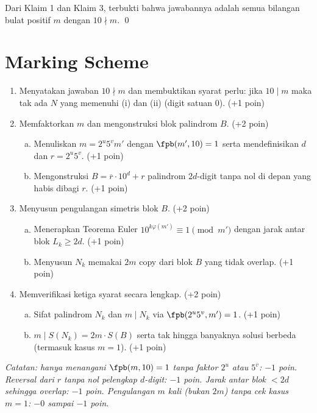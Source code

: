 Dari Klaim 1 dan Klaim 3, terbukti bahwa jawabannya adalah semua bilangan bulat positif $m$ dengan $10 \nmid m$. \qed

\newpage
\section{Marking Scheme}
\begin{enumerate}[1)]
    \item Menyatakan jawaban $10 \nmid m$ dan membuktikan syarat perlu: jika $10 \mid m$ maka tak ada $N$ yang memenuhi (i) dan (ii) (digit satuan $0$). (+1 poin)
    \item Memfaktorkan $m$ dan mengonstruksi blok palindrom $B$. (+2 poin)
    \begin{enumerate}[(a)]
        \item Menuliskan $m = 2^u 5^v m'$ dengan $\fpb(m', 10) = 1$ serta mendefinisikan $d$ dan $r = 2^u 5^v$. (+1 poin)
        \item Mengonstruksi $B = \overline{r} \cdot 10^d + r$ palindrom $2d$-digit tanpa nol di depan yang habis dibagi $r$. (+1 poin)
    \end{enumerate}
    \item Menyusun pengulangan simetris blok $B$. (+2 poin)
    \begin{enumerate}[(a)]
        \item Menerapkan Teorema Euler $10^{k\varphi(m')} \equiv 1 \pmod{m'}$ dengan jarak antar blok $L_k \ge 2d$. (+1 poin)
        \item Menyusun $N_k$ memakai $2m$ copy dari blok $B$ yang tidak overlap. (+1 poin)
    \end{enumerate}
    \item Memverifikasi ketiga syarat secara lengkap. (+2 poin)
    \begin{enumerate}[(a)]
        \item Sifat palindrom $N_k$ dan $m \mid N_k$ via $\fpb(2^u 5^v, m') = 1$. (+1 poin)
        \item $m \mid S(N_k) = 2m \cdot S(B)$ serta tak hingga banyaknya solusi berbeda (termasuk kasus $m = 1$). (+1 poin)
    \end{enumerate}
\end{enumerate}

\textit{Catatan: hanya menangani $\fpb(m, 10) = 1$ tanpa faktor $2^u$ atau $5^v$: $-1$ poin. Reversal dari $r$ tanpa nol pelengkap $d$-digit: $-1$ poin. Jarak antar blok $< 2d$ sehingga overlap: $-1$ poin. Pengulangan $m$ kali (bukan $2m$) tanpa cek kasus $m = 1$: $-0$ sampai $-1$ poin.}

